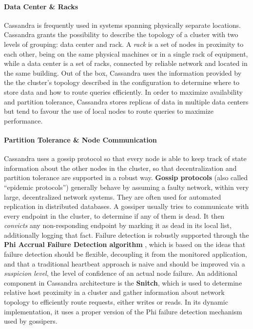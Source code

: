 \paragraph{Data Center \& Racks} Cassandra is frequently used in systems spanning physically separate locations. Cassandra grants the possibility to describe the topology of a cluster with two levels of grouping: data center and rack. A \textit{rack} is a set of nodes in proximity to each other, being on the same physical machines or in a single rack of equipment, while a data center is a set of racks, connected by reliable network and located in the same building. Out of the box, Cassandra uses the information provided by the the cluster’s topology described in the configuration to determine where to store data and how to route queries efficiently. In order to maximize availability and partition tolerance, Cassandra stores replicas of data in multiple data centers but tend to favour the use of local nodes to route queries to maximize performance.

\paragraph{Partition Tolerance \& Node Communication} Cassandra uses a gossip protocol so that every node is able to keep track of state information about the other nodes in the cluster, so that decentralization and partition tolerance are supported in a robust way. \textbf{Gossip protocols} (also called “epidemic protocols”) generally behave by assuming a faulty network, within very large, decentralized network systems. They are often used for automated  replication in distributed databases.
A gossiper usually tries to communicate with every endpoint in the cluster, to determine if any of them is dead. It then \textit{convicts} any non-responding endpoint by marking it as dead in its local list, additionally logging that fact.
Failure detection is robustly supported through the \textbf{Phi Accrual Failure Detection algorithm} \cite{hayashibara2004spl}, which is based on the ideas that failure detection should be flexible, decoupling it from the monitored application, and that a traditional heartbeat approach is naive and should be improved via a \textit{suspicion level}, the level of confidence of an actual node failure.
An additional component in Cassandra architecture is the \textbf{Snitch}, which is used to determine relative host proximity in a cluster and gather information about network topology to efficiently route requests, either writes or reads. In its dynamic implementation, it uses a proper version of the Phi failure detection mechanism used by gossipers.


